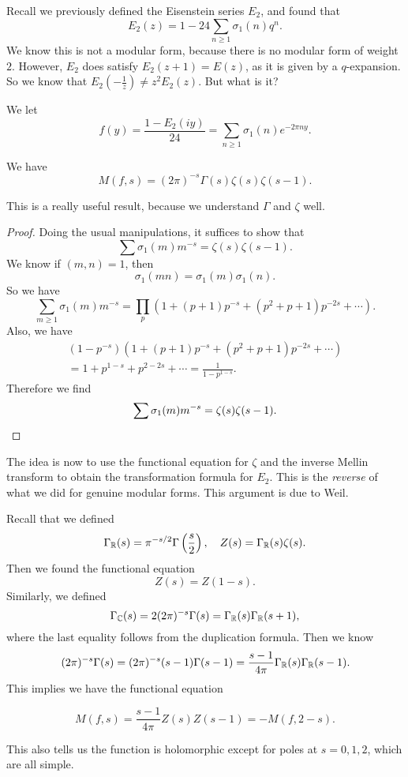 \documentclass[a4paper]{article}
\begin{document}
Recall we previously defined the Eisenstein series $E_2$, and found that
\[
  E_2(z) = 1 - 24 \sum_{n \geq 1} \sigma_1(n) q^n.
\]
We know this is not a modular form, because there is no modular form of weight $2$. However, $E_2$ does satisfy $E_2(z + 1) = E(z)$, as it is given by a $q$-expansion. So we know that $E_2(-\frac{1}{z}) \not= z^2 E_2(z)$. But what is it?

We let
\[
  f(y) = \frac{1 - E_2(iy)}{24} = \sum_{n \geq 1} \sigma_1(n) e^{-2\pi n y}.
\]
\begin{prop}
  We have
  \[
    M(f, s) = (2\pi)^{-s} \Gamma(s) \zeta(s) \zeta(s - 1).
  \]
\end{prop}
This is a really useful result, because we understand $\Gamma$ and $\zeta$ well.

\begin{proof}
  Doing the usual manipulations, it suffices to show that
  \[
    \sum \sigma_1(m) m^{-s} = \zeta(s) \zeta(s - 1).
  \]
  We know if $(m, n) = 1$, then
  \[
    \sigma_1(mn) = \sigma_1(m) \sigma_1(n).
  \]
  So we have
  \[
    \sum_{m \geq 1} \sigma_1(m) m^{-s} = \prod_p (1 + (p + 1) p^{-s} + (p^2 + p + 1) p^{-2s} + \cdots).
  \]
  Also, we have
  \begin{multline*}
    (1 - p^{-s}) (1 + (p + 1) p^{-s} + (p^2 + p + 1) p^{-2s} + \cdots) \\
    = 1 + p^{1 - s} + p^{2 - 2s} + \cdots = \frac{1}{1 - p^{1 - s}}.
  \end{multline*}
  Therefore we find
  \[
    \sum \sigma_1(m) m^{-s} = \zeta(s) \zeta(s - 1).\qedhere
  \]
\end{proof}
The idea is now to use the functional equation for $\zeta$ and the inverse Mellin transform to obtain the transformation formula for $E_2$. This is the \emph{reverse} of what we did for genuine modular forms. This argument is due to Weil.

Recall that we defined
\[
  \Gamma_{\mathbb{R}}(s) = \pi^{-s/2} \Gamma\left(\frac{s}{2}\right),\quad Z(s) = \Gamma_{\mathbb{R}}(s) \zeta(s).
\]
Then we found the functional equation
\[
  Z(s) = Z(1 - s).
\]
Similarly, we defined
\[
  \Gamma_{\mathbb{C}}(s) = 2(2\pi)^{-s} \Gamma(s) = \Gamma_{\mathbb{R}}(s) \Gamma_{\mathbb{R}}(s + 1),
\]
where the last equality follows from the duplication formula. Then we know
\[
  (2\pi)^{-s} \Gamma(s) = (2\pi)^{-s} (s - 1) \Gamma(s - 1) = \frac{s - 1}{4\pi} \Gamma_{\mathbb{R}}(s) \Gamma_{\mathbb{R}}(s - 1).
\]
This implies we have the functional equation
\begin{prop}
  \[
    M(f, s) = \frac{s - 1}{4\pi} Z(s) Z(s - 1) = - M(f, 2 - s).
  \]
\end{prop}
This also tells us the function is holomorphic except for poles at $s = 0, 1, 2$, which are all simple.
\end{document}
